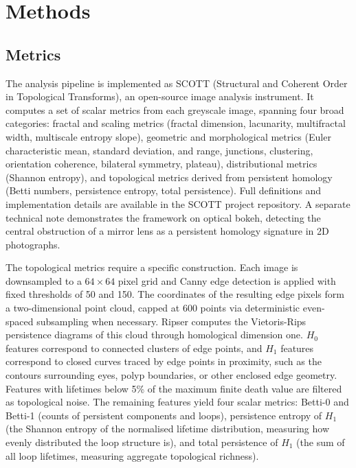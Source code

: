 \documentclass[a4paper,12pt]{article}
\begin{document}
\section{Methods}

\subsection{Metrics}

The analysis pipeline is implemented as SCOTT (Structural and Coherent Order in Topological Transforms), an open-source image analysis instrument. It computes a set of scalar metrics from each greyscale image, spanning four broad categories: fractal and scaling metrics (fractal dimension, lacunarity, multifractal width, multiscale entropy slope), geometric and morphological metrics (Euler characteristic mean, standard deviation, and range, junctions, clustering, orientation coherence, bilateral symmetry, plateau), distributional metrics (Shannon entropy), and topological metrics derived from persistent homology (Betti numbers, persistence entropy, total persistence). Full definitions and implementation details are available in the SCOTT project repository. A separate technical note \citep{cundill2026bokeh} demonstrates the framework on optical bokeh, detecting the central obstruction of a mirror lens as a persistent homology signature in 2D photographs.

The topological metrics require a specific construction. Each image is downsampled to a $64 \times 64$ pixel grid and Canny edge detection \citep{canny1986} is applied with fixed thresholds of 50 and 150. The coordinates of the resulting edge pixels form a two-dimensional point cloud, capped at 600 points via deterministic even-spaced subsampling when necessary. Ripser \citep{tralie2018} computes the Vietoris-Rips persistence diagrams of this cloud through homological dimension one. $H_0$ features correspond to connected clusters of edge points, and $H_1$ features correspond to closed curves traced by edge points in proximity, such as the contours surrounding eyes, polyp boundaries, or other enclosed edge geometry. Features with lifetimes below 5\% of the maximum finite death value are filtered as topological noise. The remaining features yield four scalar metrics: Betti-0 and Betti-1 (counts of persistent components and loops), persistence entropy of $H_1$ (the Shannon entropy of the normalised lifetime distribution, measuring how evenly distributed the loop structure is), and total persistence of $H_1$ (the sum of all loop lifetimes, measuring aggregate topological richness).
\end{document}
